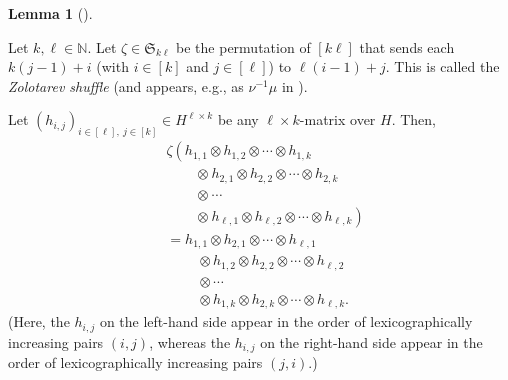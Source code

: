 \documentclass[numbers=enddot,12pt,final,onecolumn,notitlepage]{scrartcl}%
\theoremstyle{definition}
\newtheorem{lem}[theo]{Lemma}
\newenvironment{lemma}[1][]
{\begin{lem}[#1]\begin{leftbar}}
{\end{leftbar}\end{lem}}
\begin{document}
\begin{lemma}
\label{lem.zol1}Let $k,\ell\in\mathbb{N}$. Let $\zeta\in\mathfrak{S}_{k\ell}$
be the permutation of $\left[  k\ell\right]  $ that sends each $k\left(
j-1\right)  +i$ (with $i\in\left[  k\right]  $ and $j\in\left[  \ell\right]
$) to $\ell\left(  i-1\right)  +j$. This is called the \emph{Zolotarev
shuffle} (and appears, e.g., as $\nu^{-1}\mu$ in \cite{Rousse94}).\footnotemark

Let $\left(  h_{i,j}\right)  _{i\in\left[  \ell\right]  ,\ j\in\left[
k\right]  }\in H^{\ell\times k}$ be any $\ell\times k$-matrix over $H$. Then,
\begin{align}
&  \zeta\left(  h_{1,1}\otimes h_{1,2}\otimes\cdots\otimes h_{1,k}\right.
\nonumber\\
&  \ \ \ \ \ \ \ \ \ \ \left.  \otimes\ h_{2,1}\otimes h_{2,2}\otimes
\cdots\otimes h_{2,k}\right. \nonumber\\
&  \ \ \ \ \ \ \ \ \ \ \left.  \otimes\ \cdots\right. \nonumber\\
&  \ \ \ \ \ \ \ \ \ \ \left.  \otimes\ h_{\ell,1}\otimes h_{\ell,2}%
\otimes\cdots\otimes h_{\ell,k}\right) \nonumber\\
&  =h_{1,1}\otimes h_{2,1}\otimes\cdots\otimes h_{\ell,1}\nonumber\\
&  \ \ \ \ \ \ \ \ \ \ \otimes h_{1,2}\otimes h_{2,2}\otimes\cdots\otimes
h_{\ell,2}\nonumber\\
&  \ \ \ \ \ \ \ \ \ \ \otimes\cdots\nonumber\\
&  \ \ \ \ \ \ \ \ \ \ \otimes h_{1,k}\otimes h_{2,k}\otimes\cdots\otimes
h_{\ell,k}. \label{pf.thm.sol-mac-1.z-prod}%
\end{align}
(Here, the $h_{i,j}$ on the left-hand side appear in the order of
lexicographically increasing pairs $\left(  i,j\right)  $, whereas the
$h_{i,j}$ on the right-hand side appear in the order of lexicographically
increasing pairs $\left(  j,i\right)  $.)
\end{lemma}
\end{document}
